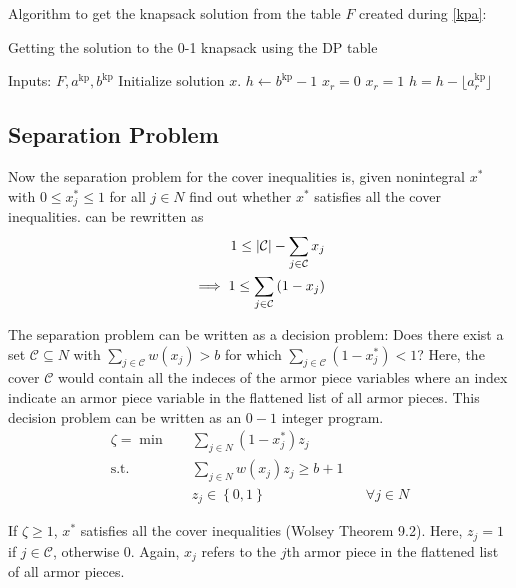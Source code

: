 \documentclass[10pt]{article}
\newcommand{\cbrace}[1]{\left\lbrace #1 \right\rbrace}
\newcommand{\C}{\mathcal{C}}
\begin{document}
    Algorithm to get the knapsack solution from the table $F$ created during \cref{kpa}:

    \begin{algorithm}
        \caption{Getting the solution to the 0-1 knapsack using the DP table}
        \begin{algorithmic}[1]
            \State Inputs: $F, a^{\mathrm{kp}}, b^{\mathrm{kp}}$
            \State Initialize solution $x$.
            \State $h \gets b^{\mathrm{kp}} - 1$
                    \State $x_r = 0$
                \Else
                    \State $x_r = 1$
                    \State $h = h - \lfloor a^{\mathrm{kp}}_r \rfloor$
                \EndIf
            \EndFor
        \end{algorithmic} 
    \end{algorithm}

    \subsection{Separation Problem}
    Now the separation problem for the cover inequalities is, given nonintegral $x^*$ with $0 \leq x_j^* \leq 1$ for all $j \in N$ find out 
    whether $x^*$ satisfies all the cover inequalities.  can be rewritten as
    \begin{align}
       1 \leq |\C| - \sum\limits_{j \in \C} x_j \notag \\
       \implies 1 \leq \sum\limits_{j \in \C} \left( 1 - x_j \right)
    \end{align}

    The separation problem can be written as a decision problem: Does there exist a set $\C \subseteq N$ with $\sum\limits_{j \in \C} w(x_j) > b$ 
    for which $\sum_{j \in \C} (1 - x_j^*) < 1$? Here, the cover $\C$ would contain all the indeces of the armor piece variables where an index
    indicate an armor piece variable in the flattened list of all armor pieces. This decision problem can be written as an $0-1$ integer program.
    \begin{align} 
        \zeta = \min \quad & \sum\limits_{j \in N} (1 - x_j^*) z_j \\
        \text{s.t.} \quad & \sum\limits_{j \in N} w(x_j) z_j \geq b + 1\\
                    \quad & z_j \in \cbrace{0, 1} && \forall j \in N
    \end{align}

    If $\zeta \geq 1$, $x^*$ satisfies all the cover inequalities (Wolsey Theorem 9.2).
    Here, $z_j = 1$ if $j \in \C$, otherwise $0$. Again, $x_j$ refers to the $j$th armor 
    piece in the flattened list of all armor pieces. 
\end{document}
